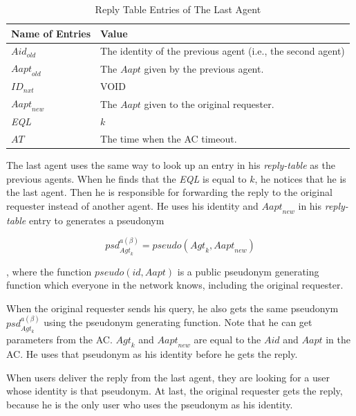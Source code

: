 \begin{table} [hbtp]
\caption{Reply Table Entries of The Last Agent}
\label{table:RTELastAgt}
\centering
\tabulinesep=2mm
\begin{tabu} to 135 mm {|X[1,c]|X[3,l]|} \hline 
Name of Entries & Value \\ \hline 
${Aid}_{old}$ & The identity of the previous agent (i.e., the second agent) \\ \hline 
${Aapt}_{old}$ & The $Aapt$ given by the previous agent. \\ \hline 
${ID}_{nxt}$ & VOID \\ \hline 
${Aapt}_{new}$ & The $Aapt$ given to the original requester. \\ \hline 
\textit{EQL} & $k$ \\ \hline 
$AT$ & The time when the AC timeout. \\ \hline 
\end{tabu}
\end{table}

The last agent uses the same way to look up an entry in his \textit{reply-table} as the previous agents. When he finds that the \textit{EQL} is equal to $k$, he notices that he is the last agent. Then he is responsible for forwarding the reply to the original requester instead of another agent. He uses his identity and ${Aapt}_{new}$ in his \textit{reply-table} entry to generates a pseudonym

\begin{equation} \label{GrindEQ__ACPPsd} 
{psd}_{{Agt}_k}^{a\left( \beta \right)}=pseudo\left({Agt}_k,{Aapt}_{new}\right)
\end{equation}

, where the function $pseudo\left(id,Aapt\right)$ is a public pseudonym generating function which everyone in the network knows, including the original requester.

When the original requester sends his query, he also gets the same pseudonym ${psd}_{{Agt}_k}^{a\left( \beta \right)}$ using the pseudonym generating function. Note that he can get parameters from the AC. ${Agt}_k$ and ${Aapt}_{new}$ are equal to the $Aid$ and $Aapt$ in the AC. He uses that pseudonym as his identity before he gets the reply.

When users deliver the reply from the last agent, they are looking for a user whose identity is that pseudonym. At last, the original requester gets the reply, because he is the only user who uses the pseudonym as his identity.

